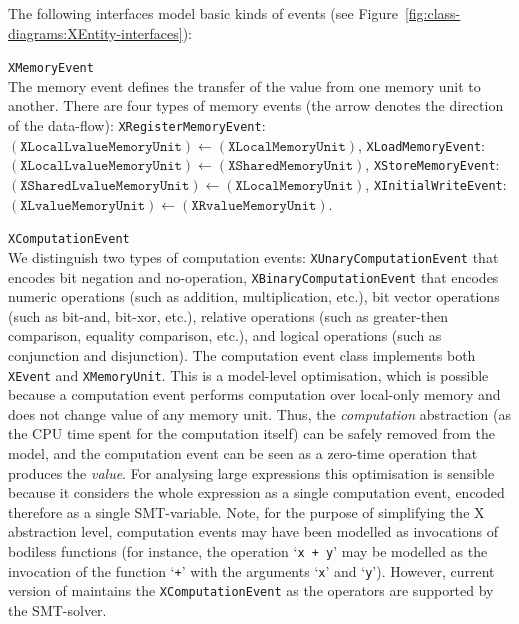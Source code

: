 The following interfaces model basic kinds of events (see Figure~\ref{fig:class-diagrams:XEntity-interfaces}):
\begin{outline}
  \1 \texttt{XMemoryEvent} \\
  The memory event defines the transfer of the value from one memory unit to another.
  There are four types of memory events (the arrow denotes the direction of the data-flow):
  \2 \texttt{XRegisterMemoryEvent}: \\
    $(\texttt{XLocalLvalueMemoryUnit}) \leftarrow (\texttt{XLocalMemoryUnit})$,
  \2 \texttt{XLoadMemoryEvent}: \\
    $(\texttt{XLocalLvalueMemoryUnit}) \leftarrow (\texttt{XSharedMemoryUnit})$,
  \2 \texttt{XStoreMemoryEvent}: \\
    $(\texttt{XSharedLvalueMemoryUnit}) \leftarrow (\texttt{XLocalMemoryUnit})$,
  \2 \texttt{XInitialWriteEvent}: \\
    $(\texttt{XLvalueMemoryUnit}) \leftarrow (\texttt{XRvalueMemoryUnit})$.

  
  \1 \texttt{XComputationEvent} \\
    We distinguish two types of computation events:
      \2 \texttt{XUnaryComputationEvent} that encodes bit negation and no-operation, 
      \2 \texttt{XBinaryComputationEvent} that encodes numeric operations (such as addition, multiplication, etc.), bit vector operations (such as bit-and, bit-xor, etc.), relative operations (such as greater-then comparison, equality comparison, etc.), and logical operations (such as conjunction and disjunction). 
    \newline
    The computation event class implements both \texttt{XEvent} and \texttt{XMemoryUnit}.
    This is a model-level optimisation, which is possible because a computation event performs computation over local-only memory and does not change value of any memory unit.
    Thus, the \textit{computation} abstraction (as the CPU time spent for the computation itself) can be safely removed from the model, and the computation event can be seen as a zero-time operation that produces the \textit{value}.
    For analysing large expressions this optimisation is sensible because it considers the whole expression as a single computation event, encoded therefore as a single SMT-variable.
    \newline
    Note, for the purpose of simplifying the X abstraction level, computation events may have been modelled as invocations of bodiless functions (for instance, the operation `\lstinline{x + y}' may be modelled as the invocation of the function `\lstinline{+}' with the arguments `\lstinline{x}' and `\lstinline{y}').
    However, current version of \porthos[2] maintains the \texttt{XComputationEvent} as the operators are supported by the SMT-solver.
    

\end{outline}
